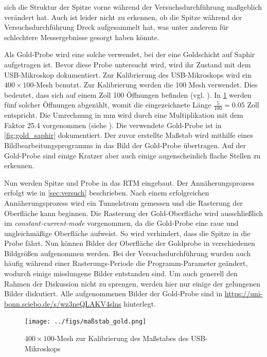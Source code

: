 sich die Struktur der Spitze vorne während der Versuchsdurchführung maßgeblich verändert hat. Auch ist leider nicht zu erkennen, ob die Spitze
während der Versuchsdurchführung Dreck aufgesammelt hat, was unter anderem für schlechtere Messergebnisse gesorgt haben könnte.\par
Als Gold-Probe wird eine solche verwendet, bei der eine Goldschicht auf Saphir aufgetragen ist. Bevor diese Probe untersucht wird, wird
ihr Zustand mit dem USB-Mikroskop dokumentiert. Zur Kalibrierung des USB-Mikroskops wird ein $400 \times 100$-Mesh benutzt. Zur Kalibrierung werden
die \num{100} Mesh verwendet. Dies bedeutet, dass sich auf einem Zoll \num{100} Öffnungen befinden (vgl. \cite{mesh}). In \cref{fig:maßstab_gold} werden fünf solcher
Öffnungen abgezählt, womit die eingezeichnete Länge $\frac{5}{100} = \num{0,05}$ Zoll entspricht. Die Umrechnung in \unit{\milli \meter} wird durch eine
Multiplikation mit dem Faktor \num{25,4} vorgenommen (siehe \cite{umrechnung}). Die verwendete Gold-Probe ist in \cref{fig:gold_saphir} dokumentiert.
Der zuvor erstellte Maßstab wird mithilfe eines Bildbearbeitungsprogramms in das Bild der Gold-Probe übertragen. Auf der Gold-Probe sind einige Kratzer
aber auch einige augenscheinlich flache Stellen zu erkennen.\par
Nun werden Spitze und Probe in das RTM eingebaut. Der Annäherungsprozess erfolgt wie in \cref{sec:versuch} beschrieben. Nach einem erfolgreichen
Annäherungsprozess wird ein Tunnelstrom gemessen und die Rasterung der Oberfläche kann beginnen. Die Rasterung der Gold-Oberfläche wird ausschließlich
im \textit{constant-current-mode} vorgenommen, da die Gold-Probe eine raue und ungleichmäßige Oberfläche aufweist. So wird verhindert, dass die
Spitze in die Probe fährt. Nun können Bilder der Oberfläche der Goldprobe in verschiedenen Bildgrößen aufgenommen werden. Bei der Versuchsdurchführung
wurden auch häufig während einer Rasterungs-Periode die Programm-Parameter geändert, wodurch einige misslungene Bilder entstanden sind. Um auch generell
den Rahmen der Diskussion nicht zu sprengen, werden hier nur einige der gelungenen Bilder diskutiert. Alle aufgenommenen Bilder der
Gold-Probe sind in \url{https://uni-bonn.sciebo.de/s/wz3neQLAKV4slns} hinterlegt.
\begin{figure}[H]
	\centering
	\texttt{[image: ../figs/maßstab\_gold.png]}
	\caption{$400 \times 100$-Mesh zur Kalibrierung des Maßstabes des USB-Mikroskops}
	\label{fig:maßstab_gold}
\end{figure}
